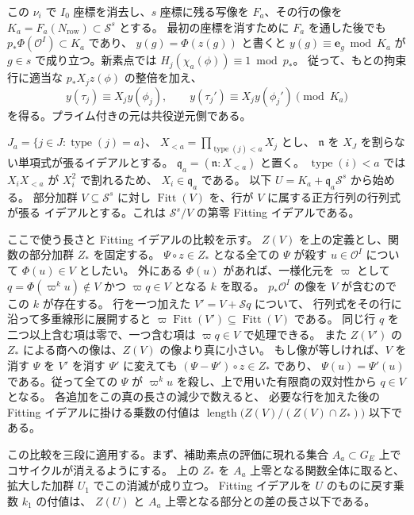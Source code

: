 この \(\nu_i\) で \(I_0\) 座標を消去し、\(s\) 座標に残る写像を
\(F_a\)、その行の像を \(K_a=F_a(N_\mathrm{row})\subset\mathcal S^s\) とする。
最初の座標を消すために \(F_a\) を通した後でも
\(p_\ast\Phi(\mathcal O^I)\subset K_a\) であり、
\(y(g)=\Phi(z(g))\) と書くと \(y(g)\equiv\mathbf e_g\bmod K_a\) が
\(g\in s\) で成り立つ。新素点では \(H_j(\chi_a(\phi))\equiv1\bmod p_\ast\)。
従って、もとの拘束行に適当な \(p_\ast X_j z(\phi)\) の整倍を加え、
\[
 y(\tau_j)\equiv X_j y(\phi_j),\qquad
 y(\tau_j')\equiv X_j y(\phi_j')\pmod{K_a}
\]
を得る。プライム付きの元は共役逆元側である。

\(J_a=\{j\in J:\operatorname{type}(j)=a\}\)、
\(X_{<a}=\prod_{\operatorname{type}(j)<a}X_j\) とし、
\(\mathfrak n\) を \(X_J\) を割らない単項式が張るイデアルとする。
\(\mathfrak q_a=(\mathfrak n:X_{<a})\) と置く。
\(\operatorname{type}(i)<a\) では \(X_iX_{<a}\) が \(X_i^2\) で割れるため、
\(X_i\in\mathfrak q_a\) である。
以下 \(U=K_a+\mathfrak q_a\mathcal S^s\) から始める。
部分加群 \(V\subseteq\mathcal S^s\) に対し
\(\operatorname{Fitt}(V)\) を、行が \(V\) に属する正方行列の行列式が張る
イデアルとする。これは \(\mathcal S^s/V\) の第零 Fitting イデアルである。

ここで使う長さと Fitting イデアルの比較を示す。
\(Z(V)\) を上の定義とし、関数の部分加群 \(Z_*\) を固定する。
\(\Psi\circ z\in Z_*\) となる全ての \(\Psi\) が殺す
\(u\in\mathcal O^I\) について \(\Phi(u)\in V\) としたい。
外にある \(\Phi(u)\) があれば、一様化元を \(\varpi\) として
\(q=\Phi(\varpi^k u)\notin V\) かつ \(\varpi q\in V\) となる \(k\) を取る。
\(p_\ast\mathcal O^I\) の像を \(V\) が含むのでこの \(k\) が存在する。
行を一つ加えた \(V'=V+\mathcal S q\) について、
行列式をその行に沿って多重線形に展開すると
\(\varpi\operatorname{Fitt}(V')\subseteq\operatorname{Fitt}(V)\) である。
同じ行 \(q\) を二つ以上含む項は零で、一つ含む項は
\(\varpi q\in V\) で処理できる。
また \(Z(V')\) の \(Z_*\) による商への像は、\(Z(V)\) の像より真に小さい。
もし像が等しければ、\(V\) を消す \(\Psi\) を \(V'\) を消す \(\Psi'\)
に変えても \((\Psi-\Psi')\circ z\in Z_*\) であり、
\(\Psi(u)=\Psi'(u)\) である。従って全ての \(\Psi\) が
\(\varpi^k u\) を殺し、上で用いた有限商の双対性から \(q\in V\) となる。
各追加をこの真の長さの減少で数えると、
必要な行を加えた後の Fitting イデアルに掛ける乗数の付値は
\(\operatorname{length}\bigl(Z(V)/(Z(V)\cap Z_*)\bigr)\) 以下である。

この比較を三段に適用する。まず、補助素点の評価に現れる集合
\(A_a\subset G_E\) 上でコサイクルが消えるようにする。
上の \(Z_*\) を \(A_a\) 上零となる関数全体に取ると、
拡大した加群 \(U_1\) でこの消滅が成り立つ。
Fitting イデアルを \(U\) のものに戻す乗数 \(k_1\) の付値は、
\(Z(U)\) と \(A_a\) 上零となる部分との差の長さ以下である。

